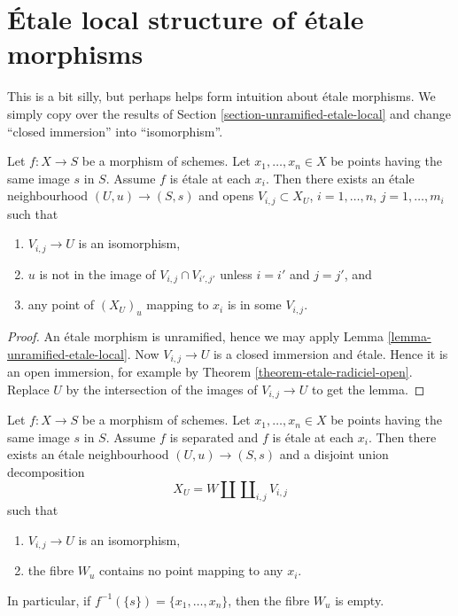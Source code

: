 \section{\'Etale local structure of \'etale morphisms}
\label{section-etale-local-etale}

\noindent
This is a bit silly, but perhaps helps form intuition about \'etale
morphisms. We simply copy over the results of
Section \ref{section-unramified-etale-local}
and change ``closed immersion'' into ``isomorphism''.

\begin{lemma}
\label{lemma-etale-etale-local}
Let $f : X \to S$ be a morphism of schemes.
Let $x_1, \ldots, x_n \in X$ be points having the same image $s$ in $S$.
Assume $f$ is \'etale at each $x_i$.
Then there exists an \'etale neighbourhood $(U, u) \to (S, s)$
and opens $V_{i, j} \subset X_U$, $i = 1, \ldots, n$, $j = 1, \ldots, m_i$
such that
\begin{enumerate}
\item $V_{i, j} \to U$ is an isomorphism,
\item $u$ is not in the image of $V_{i, j} \cap V_{i', j'}$ unless
$i = i'$ and $j = j'$, and
\item any point of $(X_U)_u$ mapping to $x_i$ is in some $V_{i, j}$.
\end{enumerate}
\end{lemma}

\begin{proof}
An \'etale morphism is unramified, hence we may apply
Lemma \ref{lemma-unramified-etale-local}.
Now $V_{i, j} \to U$ is a closed immersion and \'etale.
Hence it is an open immersion, for example by
Theorem \ref{theorem-etale-radiciel-open}.
Replace $U$ by the intersection of the images of $V_{i, j} \to U$
to get the lemma.
\end{proof}

\begin{lemma}
\label{lemma-etale-etale-local-technical}
Let $f : X \to S$ be a morphism of schemes.
Let $x_1, \ldots, x_n \in X$ be points having the same image $s$ in $S$.
Assume $f$ is separated and $f$ is \'etale at each $x_i$.
Then there exists an \'etale neighbourhood $(U, u) \to (S, s)$
and a disjoint union decomposition
$$
X_U =
W \amalg \coprod\nolimits_{i, j} V_{i, j}
$$
such that
\begin{enumerate}
\item $V_{i, j} \to U$ is an isomorphism,
\item the fibre $W_u$ contains no point mapping to any $x_i$.
\end{enumerate}
In particular, if $f^{-1}(\{s\}) = \{x_1, \ldots, x_n\}$, then
the fibre $W_u$ is empty.
\end{lemma}

